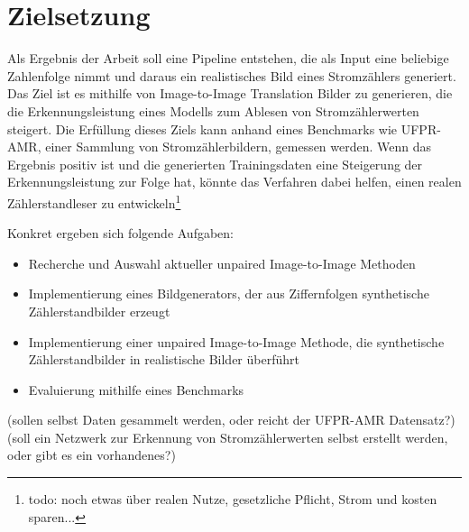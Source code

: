 \chapter*{Zielsetzung}
Als Ergebnis der Arbeit soll eine Pipeline entstehen,
die als Input eine beliebige Zahlenfolge nimmt und daraus ein realistisches Bild eines Stromzählers generiert.
Das Ziel ist es mithilfe von Image-to-Image Translation Bilder zu generieren, die die Erkennungsleistung eines Modells
 zum Ablesen von Stromzählerwerten steigert.
Die Erfüllung dieses Ziels kann anhand eines Benchmarks wie UFPR-AMR\cite{ufpr}, einer Sammlung von Stromzählerbildern, gemessen werden.
Wenn das Ergebnis positiv ist und die generierten Trainingsdaten eine Steigerung der Erkennungsleistung zur Folge hat,
könnte das Verfahren dabei helfen, einen realen Zählerstandleser zu entwickeln\footnote{todo: noch etwas über realen Nutze, gesetzliche Pflicht, Strom und kosten sparen...}

Konkret ergeben sich folgende Aufgaben:
\begin{itemize}
  \item Recherche und Auswahl aktueller unpaired Image-to-Image Methoden
  \item Implementierung eines Bildgenerators, der aus Ziffernfolgen synthetische Zählerstandbilder erzeugt
  \item Implementierung einer unpaired Image-to-Image Methode, die synthetische Zählerstandbilder in realistische Bilder überführt
  \item Evaluierung mithilfe eines Benchmarks
\end{itemize}

(sollen selbst Daten gesammelt werden, oder reicht der UFPR-AMR Datensatz?)
(soll ein Netzwerk zur Erkennung von Stromzählerwerten selbst erstellt werden, oder gibt es ein vorhandenes?)